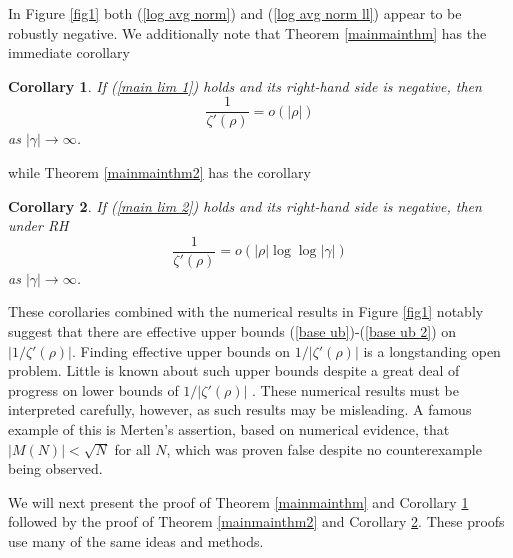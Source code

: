 \documentclass[11pt,article]{amsart}
\numberwithin{equation}{section}
\newtheorem{cor}{Corollary}
\numberwithin{equation}{section}
\numberwithin{lemma}{section}
\numberwithin{prop}{section}
\begin{document}
In Figure \ref{fig1} both (\ref{log avg norm}) and (\ref{log avg norm ll}) appear to be robustly negative. We additionally note that Theorem \ref{mainmainthm} has the immediate corollary
\begin{cor}
If (\ref{main lim 1}) holds and its right-hand side is negative, then 
\begin{equation}
\frac{1}{\zeta'(\rho)}=o\left(\left|\rho\right|\right) \label{base ub}
\end{equation}
as $\left|\gamma\right|\rightarrow \infty$.
\label{maincor}
\end{cor}
\hspace{-.4cm}while Theorem \ref{mainmainthm2} has the corollary
\begin{cor}
If (\ref{main lim 2}) holds and its right-hand side is negative, then under RH 
\begin{equation}
\frac{1}{\zeta'(\rho)}=o\left(\left|\rho\right|\log\log \left|\gamma\right|\right) \label{base ub 2}
\end{equation}
as $\left|\gamma\right|\rightarrow \infty$.
\label{maincor2}
\end{cor}
\hspace{-.4cm}These corollaries combined with the numerical results in Figure \ref{fig1} notably suggest that there are effective upper bounds (\ref{base ub})-(\ref{base ub 2}) on $\left|1/\zeta'(\rho)\right|$. Finding effective upper bounds on $1/\left|\zeta'(\rho)\right|$ is a longstanding open problem. Little is known \cite{gonek1} \cite{hejhal} \cite{hko} \cite{bui gonek mili} about such upper bounds despite a great deal of progress on lower bounds of $1/\left|\zeta'(\rho)\right|$ \cite{gonek1} \cite{mandng1} \cite{titchmarsh} \cite{hlz} \cite{rudsound} \cite{gao zhao}. These numerical results must be interpreted carefully, however, as such results may be misleading. A famous example of this is Merten's assertion, based on numerical evidence, that $\left|M(N)\right|<\sqrt{N}$ for all $N$, which was proven false \cite{odlyzko} despite no counterexample being observed. 







We will next present the proof of Theorem \ref{mainmainthm} and Corollary \ref{maincor} followed by the proof of Theorem \ref{mainmainthm2} and Corollary \ref{maincor2}. These proofs use many of the same ideas and methods. 
\end{document}
